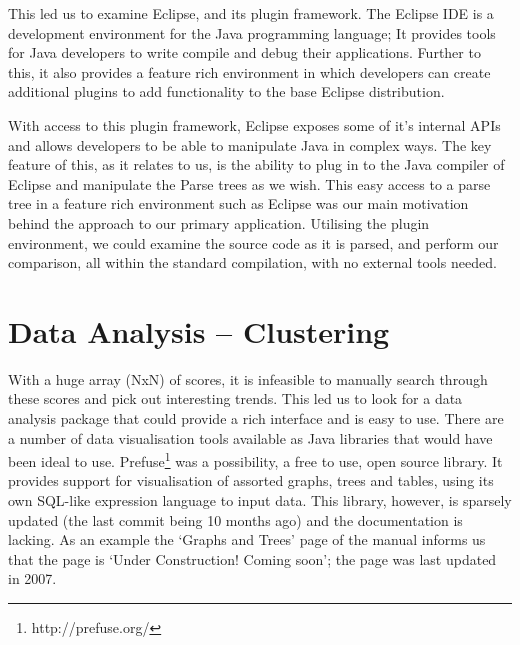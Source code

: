 This led us to examine Eclipse, and its plugin framework.
The Eclipse IDE is a development environment for the Java programming language;
It provides tools for Java developers to write compile and debug their applications.
Further to this, it also provides a feature rich environment in which developers
can create additional plugins to add functionality to the base Eclipse distribution.

With access to this plugin framework, Eclipse exposes some of it's internal APIs
and allows developers to be able to manipulate Java in complex ways. The key feature
of this, as it relates to us, is the ability to plug in to the Java compiler of Eclipse
and manipulate the Parse trees as we wish. This easy access to a parse tree in a
feature rich environment such as Eclipse was our main motivation behind the approach
to our primary application. Utilising the plugin environment, we could examine the
source code as it is parsed, and perform our comparison, all within the standard
compilation, with no external tools needed.

\section{Data Analysis -- Clustering}

With a huge array (NxN) of scores, it is infeasible to manually search through
these scores and pick out interesting trends. This led us to look for a data
analysis package that could provide a rich interface and is easy to use. There
are a number of data visualisation tools available as Java libraries that would
have been ideal to use. Prefuse\footnote{http://prefuse.org/} was a possibility, a free
to use, open source library. It provides support for visualisation of assorted
graphs, trees and tables, using its own SQL-like expression language to input
data. This library, however, is sparsely updated (the last commit being 10
months ago) and the documentation is lacking. As an example the `Graphs and
Trees' page of the manual informs us that the page is `Under Construction!
Coming soon'; the page was last updated in 2007.

